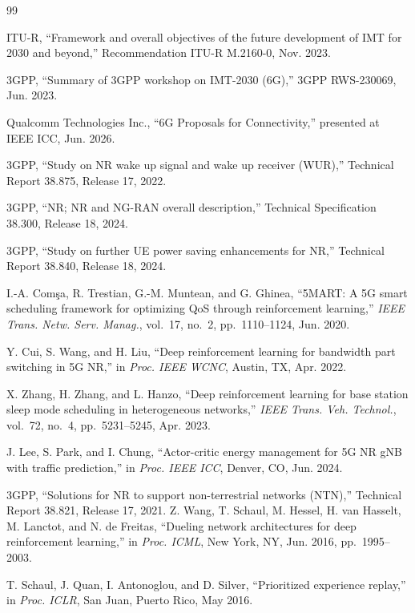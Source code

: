 \documentclass[conference]{IEEEtran}
\begin{document}
\begin{thebibliography}{99}

ITU-R, ``Framework and overall objectives of the future development of
IMT for 2030 and beyond,'' Recommendation ITU-R M.2160-0, Nov. 2023.

3GPP, ``Summary of 3GPP workshop on IMT-2030 (6G),''
3GPP RWS-230069, Jun. 2023.

Qualcomm Technologies Inc., ``6G Proposals for Connectivity,''
presented at IEEE ICC, Jun. 2026.

3GPP, ``Study on NR wake up signal and wake up receiver (WUR),''
Technical Report 38.875, Release 17, 2022.

3GPP, ``NR; NR and NG-RAN overall description,''
Technical Specification 38.300, Release 18, 2024.

3GPP, ``Study on further UE power saving enhancements for NR,''
Technical Report 38.840, Release 18, 2024.

I.-A. Com\c{s}a, R. Trestian, G.-M. Muntean, and G. Ghinea,
``5MART: A 5G smart scheduling framework for optimizing QoS
through reinforcement learning,''
\emph{IEEE Trans. Netw. Serv. Manag.}, vol.~17, no.~2,
pp.~1110--1124, Jun. 2020.

Y. Cui, S. Wang, and H. Liu,
``Deep reinforcement learning for bandwidth part switching in 5G NR,''
in \emph{Proc. IEEE WCNC}, Austin, TX, Apr. 2022.

X. Zhang, H. Zhang, and L. Hanzo,
``Deep reinforcement learning for base station sleep mode scheduling
in heterogeneous networks,''
\emph{IEEE Trans. Veh. Technol.}, vol.~72, no.~4,
pp.~5231--5245, Apr. 2023.

J. Lee, S. Park, and I. Chung,
``Actor-critic energy management for 5G NR gNB with traffic prediction,''
in \emph{Proc. IEEE ICC}, Denver, CO, Jun. 2024.

3GPP, ``Solutions for NR to support non-terrestrial networks (NTN),''
Technical Report 38.821, Release 17, 2021.
Z. Wang, T. Schaul, M. Hessel, H. van Hasselt, M. Lanctot, and N. de Freitas,
``Dueling network architectures for deep reinforcement learning,''
in \emph{Proc. ICML}, New York, NY, Jun. 2016, pp.~1995--2003.

T. Schaul, J. Quan, I. Antonoglou, and D. Silver,
``Prioritized experience replay,''
in \emph{Proc. ICLR}, San Juan, Puerto Rico, May 2016.

\end{thebibliography}
\end{document}

